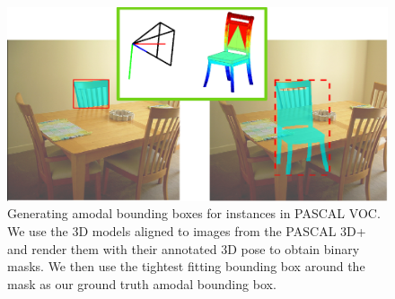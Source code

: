\begin{figure}
  \centering
  \includegraphics[width=\linewidth]{figures/amodal/Amodal.png}
  \caption{ Generating amodal bounding boxes for instances in PASCAL VOC. We use the 3D models aligned to images from the PASCAL 3D+ \cite{pascal3d} and render them with their annotated 3D pose to obtain binary masks. We then use the tightest fitting bounding box around the mask as our ground truth amodal bounding box.}
\end{figure}

